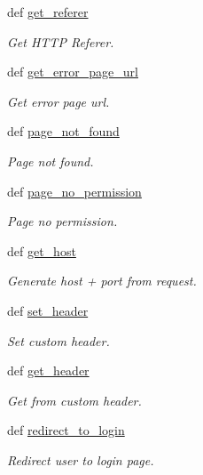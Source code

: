 \begin{DoxyCompactItemize}
def \hyperlink{namespacecore_1_1helper_1_1common__help_a2731bb88afebd39c118ad0f909072875}{get\-\_\-referer}
\begin{DoxyCompactList}\small\item\em Get H\-T\-T\-P Referer. \end{DoxyCompactList}\item 
def \hyperlink{namespacecore_1_1helper_1_1common__help_a69b980279f040143e1ba5b667cda0426}{get\-\_\-error\-\_\-page\-\_\-url}
\begin{DoxyCompactList}\small\item\em Get error page url. \end{DoxyCompactList}\item 
def \hyperlink{namespacecore_1_1helper_1_1common__help_ae5f2a65d2ae66f393a919a9ffeaddfe2}{page\-\_\-not\-\_\-found}
\begin{DoxyCompactList}\small\item\em Page not found. \end{DoxyCompactList}\item 
def \hyperlink{namespacecore_1_1helper_1_1common__help_a9989674f8014cc691456426220c42a12}{page\-\_\-no\-\_\-permission}
\begin{DoxyCompactList}\small\item\em Page no permission. \end{DoxyCompactList}\item 
def \hyperlink{namespacecore_1_1helper_1_1common__help_a44f736c7e374368baf25b3229ad8aa3e}{get\-\_\-host}
\begin{DoxyCompactList}\small\item\em Generate host + port from request. \end{DoxyCompactList}\item 
def \hyperlink{namespacecore_1_1helper_1_1common__help_a8b64347fe5debf56e14a50722e399d22}{set\-\_\-header}
\begin{DoxyCompactList}\small\item\em Set custom header. \end{DoxyCompactList}\item 
def \hyperlink{namespacecore_1_1helper_1_1common__help_abfc11a16450f65cd8dd32d39c2a1e67c}{get\-\_\-header}
\begin{DoxyCompactList}\small\item\em Get from custom header. \end{DoxyCompactList}\item 
def \hyperlink{namespacecore_1_1helper_1_1common__help_a5dbe3a295c588e8f90dfea62e0e76d96}{redirect\-\_\-to\-\_\-login}
\begin{DoxyCompactList}\small\item\em Redirect user to login page. \end{DoxyCompactList}\end{DoxyCompactItemize}


